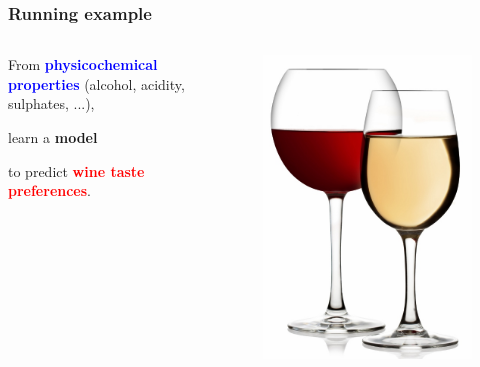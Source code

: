 \documentclass{beamer}
\newcommand{\X}[1]{\textcolor{blue}{#1}}
\newcommand{\y}[1]{\textcolor{red}{#1}}
\newcommand{\model}[1]{\textcolor{mygreen}{#1}}
\begin{document}
\begin{frame}
    \frametitle{Running example}

    \begin{columns}
    \begin{column}{0.5\textwidth}

    \begin{center}
    From {\bf \X{physicochemical properties}} (alcohol, acidity, sulphates, ...),

    \vspace{1cm}
    learn a {\bf \model{model}}
    \vspace{1cm}

    to predict {\bf \y{wine taste preferences}}.

    \end{center}

    \end{column}
    \begin{column}{0.5\textwidth}
      \begin{figure}
      \vspace{-0.5cm}
      \includegraphics[scale=0.6]{./figures/wine.jpg}
      \end{figure}
    \end{column}
    \end{columns}
\end{frame}
\end{document}
